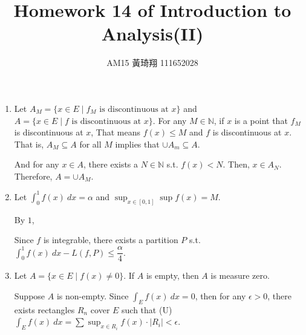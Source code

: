 \documentclass[12pt]{article}
\title{Homework 14 of Introduction to Analysis(II)}
\author{AM15 黃琦翔 111652028}
\begin{document}
\maketitle
\begin{enumerate}
    \item Let $A_M = \{x \in E \mid f_M\text{ is discontinuous at } x\}$ and $A = \{ x\in E \mid f\text{ is discontinuous at } x\}$.
    For any $M \in \mathbb{N}$, if $x$ is a point that $f_M$ is discontinuous at $x$, 
    That means $f(x) \leq M$ and $f$ is discontinuous at $x$.
    That is, $A_M \subseteq A$ for all $M$ implies that $\cup A_m \subseteq A$.

    And for any $x \in A$, there exists a $N \in \mathbb{N}$ s.t. $f(x) < N$.
    Then, $x \in A_N$.
    Therefore, $A = \cup A_M$.

    \item Let $\displaystyle\int_0^1 f(x)\ dx = \alpha$ and $\displaystyle\sup_{x\in [0, 1]} \sup f(x) = M$.
    
    By $1$, 
    
    Since $f$ is integrable, there exists a partition $P$ s.t. $\int_{0}^{1} f(x)\ dx - L(f, P) \leq \dfrac{\alpha}{4}$.



    \item Let $A = \{x \in E\mid f(x)\neq 0\}$. If $A$ is empty, then $A$ is measure zero.
    
    Suppose $A$ is non-empty.
    Since $\displaystyle\int_{E} f(x)\ dx = 0$, then for any $\epsilon > 0$,
    there exists rectangles $R_n$ cover $E$ such that (U)$\displaystyle\int_{E} f(x)\ dx = \sum \displaystyle\sup_{x \in R_i} f(x) \cdot |R_i| < \epsilon$.
    
\end{enumerate}
\end{document}
